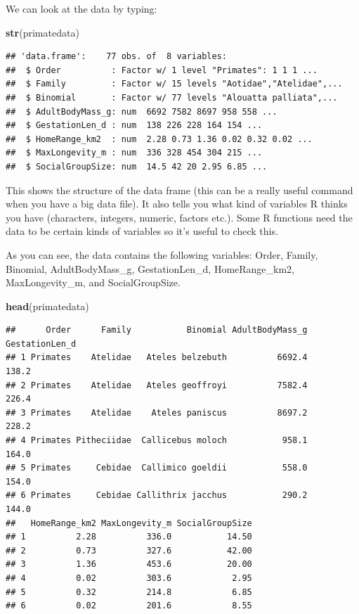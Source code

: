 \documentclass[12pt]{article}
\newcommand{\KeywordTok}[1]{\textcolor[rgb]{0.13,0.29,0.53}{\textbf{{#1}}}}
\newcommand{\NormalTok}[1]{{#1}}
\begin{document}
We can look at the data by typing:

\begin{snugshade}
\begin{Highlighting}[]
\KeywordTok{str}\NormalTok{(primatedata)}
\end{Highlighting}
\end{snugshade}

\begin{verbatim}
## 'data.frame':    77 obs. of  8 variables:
##  $ Order          : Factor w/ 1 level "Primates": 1 1 1 ...
##  $ Family         : Factor w/ 15 levels "Aotidae","Atelidae",...
##  $ Binomial       : Factor w/ 77 levels "Alouatta palliata",...
##  $ AdultBodyMass_g: num  6692 7582 8697 958 558 ...
##  $ GestationLen_d : num  138 226 228 164 154 ...
##  $ HomeRange_km2  : num  2.28 0.73 1.36 0.02 0.32 0.02 ...
##  $ MaxLongevity_m : num  336 328 454 304 215 ...
##  $ SocialGroupSize: num  14.5 42 20 2.95 6.85 ...
\end{verbatim}

This shows the structure of the data frame (this can be a really useful
command when you have a big data file). It also tells you what kind of
variables R thinks you have (characters, integers, numeric, factors
etc.). Some R functions need the data to be certain kinds of variables
so it's useful to check this.

As you can see, the data contains the following variables: Order,
Family, Binomial, AdultBodyMass\_g, GestationLen\_d, HomeRange\_km2,
MaxLongevity\_m, and SocialGroupSize.

\begin{snugshade}
\begin{Highlighting}[]
\KeywordTok{head}\NormalTok{(primatedata)}
\end{Highlighting}
\end{snugshade}

\begin{verbatim}
##      Order      Family           Binomial AdultBodyMass_g GestationLen_d
## 1 Primates    Atelidae   Ateles belzebuth          6692.4          138.2
## 2 Primates    Atelidae   Ateles geoffroyi          7582.4          226.4
## 3 Primates    Atelidae    Ateles paniscus          8697.2          228.2
## 4 Primates Pitheciidae  Callicebus moloch           958.1          164.0
## 5 Primates     Cebidae  Callimico goeldii           558.0          154.0
## 6 Primates     Cebidae Callithrix jacchus           290.2          144.0
##   HomeRange_km2 MaxLongevity_m SocialGroupSize
## 1          2.28          336.0           14.50
## 2          0.73          327.6           42.00
## 3          1.36          453.6           20.00
## 4          0.02          303.6            2.95
## 5          0.32          214.8            6.85
## 6          0.02          201.6            8.55
\end{verbatim}
\end{document}
